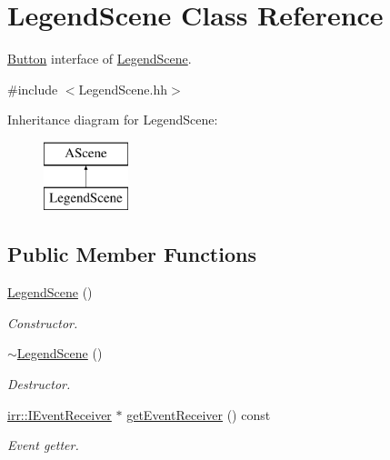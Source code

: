 \hypertarget{classLegendScene}{}\section{Legend\+Scene Class Reference}
\label{classLegendScene}


\hyperlink{classButton}{Button} interface of \hyperlink{classLegendScene}{Legend\+Scene}.  




{\ttfamily \#include $<$Legend\+Scene.\+hh$>$}

Inheritance diagram for Legend\+Scene\+:\begin{figure}[H]
\begin{center}
\leavevmode
\includegraphics[height=2.000000cm]{classLegendScene}
\end{center}
\end{figure}
\subsection*{Public Member Functions}
\begin{DoxyCompactItemize}
\item 
\hyperlink{classLegendScene_a33a4d96e0e320724e60d565dec448e38}{Legend\+Scene} ()
\begin{DoxyCompactList}\small\item\em Constructor. \end{DoxyCompactList}\item 
\hyperlink{classLegendScene_a88e66f9964236616735c7b9873641141}{$\sim$\+Legend\+Scene} ()
\begin{DoxyCompactList}\small\item\em Destructor. \end{DoxyCompactList}\item 
\hyperlink{classirr_1_1IEventReceiver}{irr\+::\+I\+Event\+Receiver} $\ast$ \hyperlink{classLegendScene_ab11340ae844c04d704f28e1ef188deae}{get\+Event\+Receiver} () const
\begin{DoxyCompactList}\small\item\em Event getter. \end{DoxyCompactList}\end{DoxyCompactItemize}


